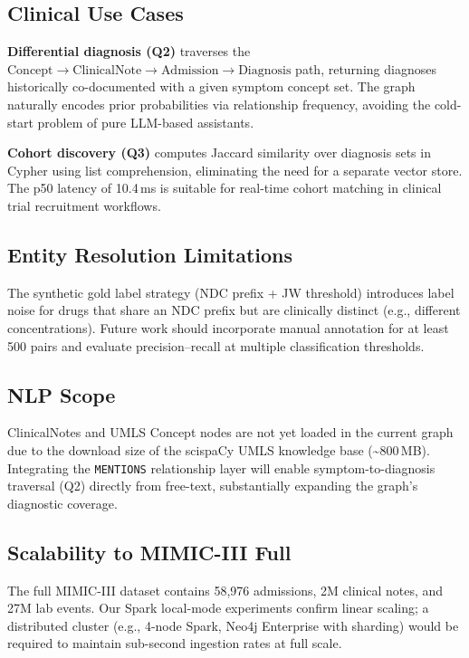 \documentclass[conference]{IEEEtran}
\begin{document}
\subsection{Clinical Use Cases}

\textbf{Differential diagnosis (Q2)} traverses the
$\text{Concept} \to \text{ClinicalNote} \to \text{Admission} \to \text{Diagnosis}$
path, returning diagnoses historically co-documented with a given symptom
concept set.
The graph naturally encodes prior probabilities via relationship frequency,
avoiding the cold-start problem of pure LLM-based assistants.

\textbf{Cohort discovery (Q3)} computes Jaccard similarity over diagnosis
sets in Cypher using list comprehension, eliminating the need for a separate
vector store.
The p50 latency of 10.4\,ms is suitable for real-time cohort matching in
clinical trial recruitment workflows.

\subsection{Entity Resolution Limitations}

The synthetic gold label strategy (NDC prefix + JW threshold) introduces
label noise for drugs that share an NDC prefix but are clinically distinct
(e.g., different concentrations).
Future work should incorporate manual annotation for at least 500 pairs and
evaluate precision--recall at multiple classification thresholds.

\subsection{NLP Scope}

ClinicalNotes and UMLS Concept nodes are not yet loaded in the current
graph due to the download size of the scispaCy UMLS knowledge base
(\textasciitilde800\,MB).
Integrating the \texttt{MENTIONS} relationship layer will enable
symptom-to-diagnosis traversal (Q2) directly from free-text, substantially
expanding the graph's diagnostic coverage.

\subsection{Scalability to MIMIC-III Full}

The full MIMIC-III dataset contains 58,976 admissions, 2M clinical notes,
and 27M lab events.
Our Spark local-mode experiments confirm linear scaling; a distributed
cluster (e.g., 4-node Spark, Neo4j Enterprise with sharding) would be
required to maintain sub-second ingestion rates at full scale.
\end{document}

